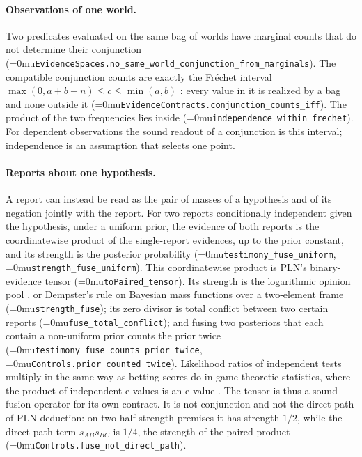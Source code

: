 \documentclass[11pt]{article}
\newcommand{\leanname}[1]{\textup{\Urlmuskip=0mu\relax\nolinkurl{#1}}}
\theoremstyle{definition}
\theoremstyle{remark}
\begin{document}
\paragraph{Observations of one world.}
Two predicates evaluated on the same bag of worlds have marginal counts that
do not determine their conjunction
(\leanname{EvidenceSpaces.no_same_world_conjunction_from_marginals}).  The
compatible conjunction counts are exactly the Fréchet interval
$\max(0,a+b-n)\le c\le\min(a,b)$ \cite{FrechetTableaux}: every value in it is
realized by a bag and none outside it
(\leanname{EvidenceContracts.conjunction_counts_iff}).  The product of the two
frequencies lies inside (\leanname{independence_within_frechet}).  For
dependent observations the sound readout of a conjunction is this interval;
independence is an assumption that selects one point.

\paragraph{Reports about one hypothesis.}
A report can instead be read as the pair of masses of a hypothesis and of its
negation jointly with the report.  For two reports conditionally independent
given the hypothesis, under a uniform prior, the evidence of both reports is
the coordinatewise product of the single-report evidences, up to the prior
constant, and its strength is the posterior probability
(\leanname{testimony_fuse_uniform}, \leanname{strength_fuse_uniform}).  This
coordinatewise product is PLN's binary-evidence tensor
(\leanname{toPaired_tensor}).  Its strength is the logarithmic opinion pool
\cite{GenestZidekPooling}, or Dempster's rule on Bayesian mass functions over a
two-element frame \cite{DempsterUpperLower} (\leanname{strength_fuse}); its
zero divisor is total conflict between two certain reports
(\leanname{fuse_total_conflict}); and fusing two posteriors that each contain a
non-uniform prior counts the prior twice
(\leanname{testimony_fuse_counts_prior_twice},
\leanname{Controls.prior_counted_twice}).  Likelihood ratios of independent
tests multiply in the same way as betting scores do in game-theoretic
statistics, where the product of independent e-values is an e-value
\cite{VovkWangEValues,ShaferVovkGTP}.  The tensor is thus a sound fusion
operator for its own contract.  It is not conjunction and not the direct path
of PLN deduction: on two half-strength premises it has strength $1/2$, while
the direct-path term $s_{AB}s_{BC}$ is $1/4$, the strength of the paired product
(\leanname{Controls.fuse_not_direct_path}).
\end{document}
